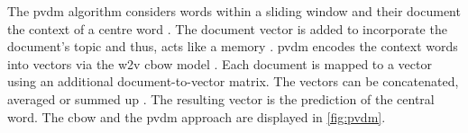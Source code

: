 The \ac{pvdm} algorithm considers words within a sliding window and their document the context of a centre word \cite{SentRep2014}.
The document vector is added to incorporate the document's topic and thus, acts like a memory \cite{SentRep2014, Top2Vec2020}.
\ac{pvdm} encodes the context words into vectors via the \ac{w2v} \ac{cbow} model \cite{glove2014}.
Each document is mapped to a vector using an additional document-to-vector matrix.
The vectors can be concatenated, averaged or summed up \cite{SentRep2014}.
The resulting vector is the prediction of the central word.
The \ac{cbow} and the \ac{pvdm} approach are displayed in \autoref{fig:pvdm}.
